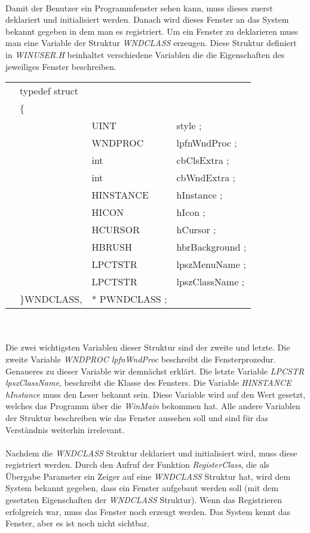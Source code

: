 \paragraph{}
Damit der Benutzer ein Programmfenster sehen kann, muss dieses zuerst deklariert und initialisiert werden. Danach wird dieses Fenster an das System bekannt gegeben in dem man es registriert. Um ein Fenster zu deklarieren muss man eine Variable der Struktur \textit{WNDCLASS} erzeugen. Diese Struktur definiert in \textit{WINUSER.H} beinhaltet verschiedene Variablen die die Eigenschaften des jeweiliges Fenster beschreiben.



\begin{tabular}{llll}
& typedef struct\\
& \{\\
& & UINT        & style ;\\
& & WNDPROC     & lpfnWndProc ;\\
& & int         & cbClsExtra ;\\
& & int         & cbWndExtra ;\\
& & HINSTANCE   & hInstance ;\\
& & HICON       & hIcon ;\\
& & HCURSOR     & hCursor ;\\
& & HBRUSH      & hbrBackground ;\\
& & LPCTSTR     & lpszMenuName ;\\
& & LPCTSTR     & lpszClassName ;\\
&\}WNDCLASS,&* PWNDCLASS ;
\end{tabular}
\\


\paragraph{}
Die zwei wichtigsten Variablen dieser Struktur sind der zweite und letzte. Die zweite Variable \textit{WNDPROC lpfnWndProc} beschreibt die Fensterprozedur. Genaueres zu dieser Variable wir demnächst erklärt. Die letzte Variable \textit{LPCSTR lpszClassName}, beschreibt die Klasse des Fensters. Die Variable \textit{HINSTANCE hInstance} muss den Leser bekannt sein. Diese Variable wird auf den Wert gesetzt, welches das Programm über die \textit{WinMain} bekommen hat. Alle andere Variablen der Struktur beschreiben wie das Fenster aussehen soll und sind für das Verständnis weiterhin irrelevant.

\paragraph{}
Nachdem die \textit{WNDCLASS} Struktur deklariert und initialisiert wird, muss diese registriert werden. Durch den Aufruf der Funktion \textit{RegisterClass}, die als Übergabe Parameter ein Zeiger auf eine \textit{WNDCLASS} Struktur hat, wird dem System bekannt gegeben, dass ein Fenster aufgebaut werden soll (mit dem gesetzten Eigenschaften der \textit{WNDCLASS} Struktur). Wenn das Registrieren erfolgreich war, muss das Fenster noch erzeugt werden. Das System kennt das Fenster, aber es ist noch nicht sichtbar.

